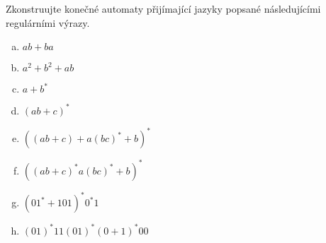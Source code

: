 \documentclass[a4paper,12pt]{amsart}
\begin{document}
    
\medskip\begin{problem}

    Zkonstruujte konečné automaty přijímající jazyky popsané následujícími regulárními výrazy.
    
    \begin{multicols}{2}
    
        \begin{enumerate}[(a)]\setlength\itemsep{12pt}
            \item $ab + ba$
            \item $a^2 + b^2 + ab$
            \item $a + b^*$
            \item $(ab + c)^*$
            \item $((ab + c)+a(bc)^* + b)^*$
            \item $((ab + c)^*a(bc)^* + b)^*$
            \item $(01^* + 101)^*0^*1$
            \item $(01)^*11(01)^*(0 + 1)^*00$
        \end{enumerate}

    \end{multicols}
    
\end{problem}
\end{document}
